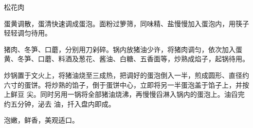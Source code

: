 %
%
%
%
%
%
%
\begin{recipe}{松花肉}

\ingredients


\preparation

\step 蛋黄调散，蛋清快速调成蛋泡。面粉过箩筛，同味精、盐慢慢加入蛋泡内，用筷子
轻轻调匀待用。

\step 猪肉、冬笋、口蘑，分别用刀剁碎。锅内放猪油少许，将猪肉调匀，依次加入蛋
黄、冬笋、口蘑、料酒及葱花、酱油、白糖、五香面等，炒熟成焰子，起锅待用。

\step 炒锅置于文火上，将猪油烧至三成热，把调好的蛋泡倒入一半，煎成圆形、直径约
六寸的蛋饼。将炒熟的馅子，倒于蛋饼中心，立即将另一半蛋泡盖于馅子上，并按上鲜豆
尖。同时另用一锅将全部猪油烧沸，再慢慢舀淋入锅内的蛋泡上。油舀完约五分钟，泌去
油，扦入盘内即成。

\features

泡嫩，鲜香，美观适口。

\end{recipe}

